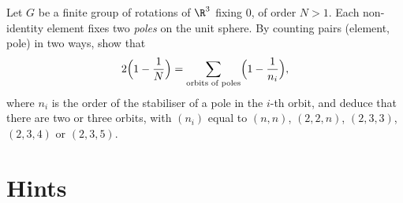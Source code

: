 \begin{exercise}[$\star\star\star$]\label{geometry:ex:finiteSO3}
Let $G$ be a finite group of rotations of $\R^3$ fixing $0$, of order $N>1$. Each non-identity element fixes two \emph{poles} on the unit
sphere. By counting pairs (element, pole) in two ways, show that
\[
2\Bigl(1-\frac1N\Bigr)=\sum_{\text{orbits of poles}}\Bigl(1-\frac1{n_i}\Bigr),
\]
where $n_i$ is the order of the stabiliser of a pole in the $i$-th orbit, and deduce that there are two or three orbits, with
$(n_i)$ equal to $(n,n)$, $(2,2,n)$, $(2,3,3)$, $(2,3,4)$ or $(2,3,5)$.
\end{exercise}

\section{Hints}

